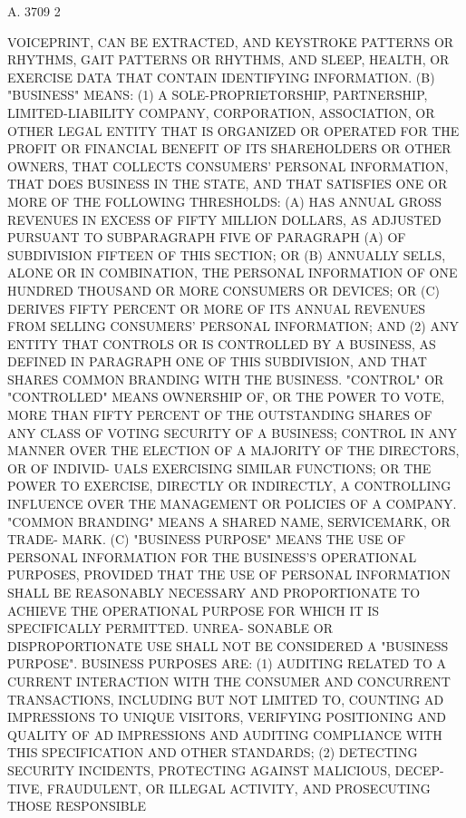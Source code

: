  A. 3709                             2
 
 VOICEPRINT, CAN BE EXTRACTED, AND KEYSTROKE PATTERNS  OR  RHYTHMS,  GAIT
 PATTERNS  OR  RHYTHMS,  AND SLEEP, HEALTH, OR EXERCISE DATA THAT CONTAIN
 IDENTIFYING INFORMATION.
   (B) "BUSINESS" MEANS:
   (1)  A  SOLE-PROPRIETORSHIP,  PARTNERSHIP,  LIMITED-LIABILITY COMPANY,
 CORPORATION, ASSOCIATION, OR OTHER LEGAL ENTITY  THAT  IS  ORGANIZED  OR
 OPERATED  FOR  THE  PROFIT  OR  FINANCIAL BENEFIT OF ITS SHAREHOLDERS OR
 OTHER OWNERS, THAT COLLECTS CONSUMERS' PERSONAL INFORMATION,  THAT  DOES
 BUSINESS  IN  THE STATE, AND THAT SATISFIES ONE OR MORE OF THE FOLLOWING
 THRESHOLDS: (A) HAS ANNUAL GROSS REVENUES IN  EXCESS  OF  FIFTY  MILLION
 DOLLARS,  AS  ADJUSTED PURSUANT TO SUBPARAGRAPH FIVE OF PARAGRAPH (A) OF
 SUBDIVISION FIFTEEN OF THIS SECTION; OR (B) ANNUALLY SELLS, ALONE OR  IN
 COMBINATION,  THE  PERSONAL  INFORMATION OF ONE HUNDRED THOUSAND OR MORE
 CONSUMERS OR DEVICES; OR (C) DERIVES FIFTY PERCENT OR MORE OF ITS ANNUAL
 REVENUES FROM SELLING CONSUMERS' PERSONAL INFORMATION; AND
   (2) ANY ENTITY THAT CONTROLS  OR  IS  CONTROLLED  BY  A  BUSINESS,  AS
 DEFINED  IN  PARAGRAPH  ONE  OF THIS SUBDIVISION, AND THAT SHARES COMMON
 BRANDING WITH THE BUSINESS.  "CONTROL" OR "CONTROLLED"  MEANS  OWNERSHIP
 OF,  OR  THE  POWER  TO VOTE, MORE THAN FIFTY PERCENT OF THE OUTSTANDING
 SHARES OF ANY CLASS OF VOTING SECURITY OF A  BUSINESS;  CONTROL  IN  ANY
 MANNER  OVER THE ELECTION OF A MAJORITY OF THE DIRECTORS, OR OF INDIVID-
 UALS EXERCISING SIMILAR FUNCTIONS; OR THE POWER TO EXERCISE, DIRECTLY OR
 INDIRECTLY, A CONTROLLING INFLUENCE OVER THE MANAGEMENT OR POLICIES OF A
 COMPANY.  "COMMON BRANDING" MEANS A SHARED NAME, SERVICEMARK, OR  TRADE-
 MARK.
   (C)  "BUSINESS  PURPOSE" MEANS THE USE OF PERSONAL INFORMATION FOR THE
 BUSINESS'S OPERATIONAL PURPOSES,  PROVIDED  THAT  THE  USE  OF  PERSONAL
 INFORMATION  SHALL  BE REASONABLY NECESSARY AND PROPORTIONATE TO ACHIEVE
 THE OPERATIONAL PURPOSE FOR WHICH IT IS SPECIFICALLY  PERMITTED.  UNREA-
 SONABLE  OR  DISPROPORTIONATE  USE  SHALL  NOT BE CONSIDERED A "BUSINESS
 PURPOSE".  BUSINESS PURPOSES ARE:
   (1) AUDITING RELATED TO A CURRENT INTERACTION WITH  THE  CONSUMER  AND
 CONCURRENT  TRANSACTIONS,  INCLUDING  BUT  NOT  LIMITED  TO, COUNTING AD
 IMPRESSIONS TO UNIQUE VISITORS, VERIFYING POSITIONING AND QUALITY OF  AD
 IMPRESSIONS  AND  AUDITING  COMPLIANCE WITH THIS SPECIFICATION AND OTHER
 STANDARDS;
   (2) DETECTING SECURITY INCIDENTS, PROTECTING AGAINST MALICIOUS, DECEP-
 TIVE, FRAUDULENT, OR ILLEGAL ACTIVITY, AND PROSECUTING THOSE RESPONSIBLE

